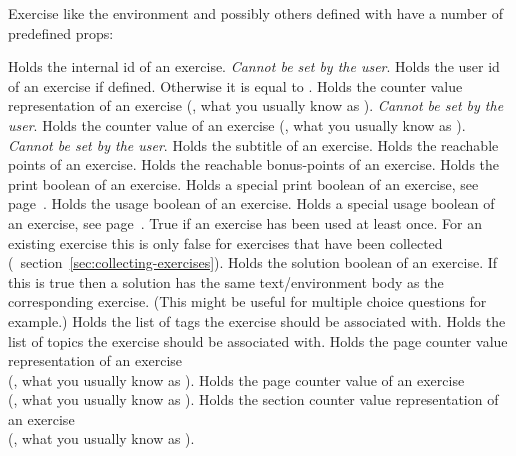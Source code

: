 \documentclass{xsim-manual}
\begin{document}
Exercise like the  environment and possibly others defined with
 have a number of predefined \acsp*{prop}:
\begin{properties}
    Holds the internal id of an exercise.  \emph{Cannot be set by the user}.
    Holds the user id of an exercise if defined.  Otherwise it is equal to
    .
    Holds the counter value representation of an exercise (\ie, what you
    usually know as ).  \emph{Cannot be set by the
      user}.
    Holds the counter value of an exercise (\ie, what you usually know as
    ).  \emph{Cannot be set by the user}.
    Holds the subtitle of an exercise.
    Holds the reachable points of an exercise.
    Holds the reachable bonus-points of an exercise.
    Holds the print boolean of an exercise.
    Holds a special print boolean of an exercise, see
    page~\pageref{property:print!}.
    Holds the usage boolean of an exercise.
    Holds a special usage boolean of an exercise, see
    page~\pageref{property:print!}.
    True if an exercise has been used at least once.  For an existing exercise
    this is only false for exercises that have been collected
    (\cf~section~\vref{sec:collecting-exercises}).
    Holds the solution boolean of an exercise.  If this is
    true then a solution has the same text\slash environment body as the
    corresponding exercise. (This might be useful for multiple choice
    questions for example.)
    Holds the list of tags the exercise should be associated with.
    Holds the list of topics the exercise should be associated with.
    Holds the page counter value representation of an exercise \\
    (\ie, what you usually know as ).
    Holds the page counter value of an exercise \\
    (\ie, what you usually know as ).
    Holds the section counter value representation of an exercise \\
    (\ie, what you usually know as ).

\end{properties}
\end{document}
